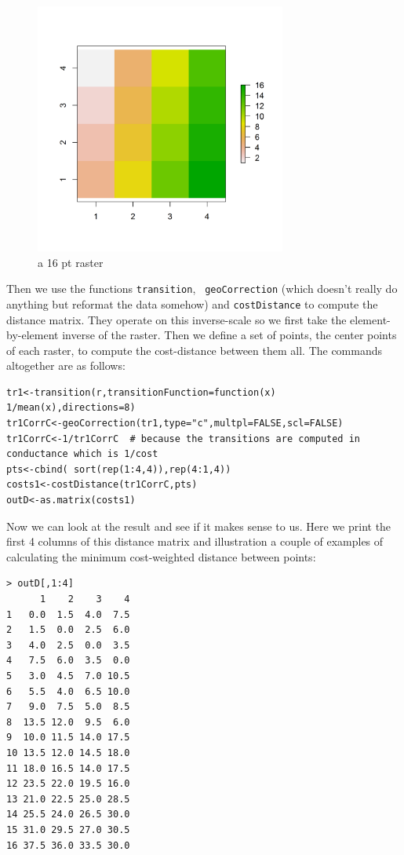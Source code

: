 \begin{figure}
\begin{center}
\includegraphics[height=3.25in,width=3.25in]{Ch10/figs/raster}
\end{center}
\caption{a 16 pt raster}
\label{ecoldist.fig.raster}
\end{figure}

Then we use the functions \mbox{\tt transition}, \mbox{\tt
  geoCorrection} (which doesn't really do anything but reformat the
data somehow) and \mbox{\tt costDistance} to compute the distance
matrix. They operate on this inverse-scale so we first take the 
element-by-element inverse of the raster. Then we define a set of points,
the center points of each raster, to compute the cost-distance between
them all. The commands altogether are as follows:
\begin{verbatim}
tr1<-transition(r,transitionFunction=function(x) 1/mean(x),directions=8)
tr1CorrC<-geoCorrection(tr1,type="c",multpl=FALSE,scl=FALSE)
tr1CorrC<-1/tr1CorrC  # because the transitions are computed in conductance which is 1/cost
pts<-cbind( sort(rep(1:4,4)),rep(4:1,4))
costs1<-costDistance(tr1CorrC,pts)
outD<-as.matrix(costs1)
\end{verbatim}
Now we can look at the result and see if it makes sense to us. Here we
print the first 4 columns of this distance matrix and illustration a
couple of examples of calculating the minimum cost-weighted distance
between points:
\small{
\begin{verbatim}
> outD[,1:4]
      1    2    3    4
1   0.0  1.5  4.0  7.5
2   1.5  0.0  2.5  6.0
3   4.0  2.5  0.0  3.5
4   7.5  6.0  3.5  0.0
5   3.0  4.5  7.0 10.5
6   5.5  4.0  6.5 10.0
7   9.0  7.5  5.0  8.5
8  13.5 12.0  9.5  6.0
9  10.0 11.5 14.0 17.5
10 13.5 12.0 14.5 18.0
11 18.0 16.5 14.0 17.5
12 23.5 22.0 19.5 16.0
13 21.0 22.5 25.0 28.5
14 25.5 24.0 26.5 30.0
15 31.0 29.5 27.0 30.5
16 37.5 36.0 33.5 30.0
\end{verbatim}
}


